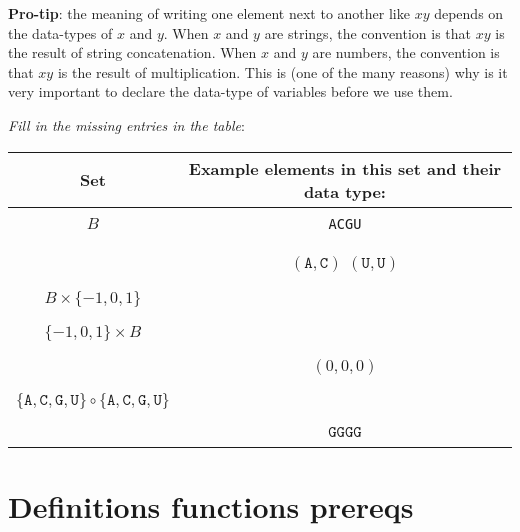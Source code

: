 \documentclass[12pt, oneside]{article}
\newcommand{\A}[0]{\texttt{A}}
\newcommand{\C}[0]{\texttt{C}}
\newcommand{\G}[0]{\texttt{G}}
\newcommand{\U}[0]{\texttt{U}}
\begin{document}
{\bf Pro-tip}: the meaning of writing one element next to another like $xy$ depends on the data-types of $x$ and 
$y$. When $x$ and $y$ are strings, the convention is that $xy$ is the result of string concatenation. 
When $x$ and $y$ are numbers, the convention is that $xy$ is the result of multiplication. This is 
(one of the many reasons) why is it very important to declare the data-type of variables before we use them.

{\it Fill in the missing entries in the table}:

\begin{center}
\begin{tabular}{cc}
{\bf  Set} & {\bf Example elements in this set and their data type}:\\
\hline 
& \\
$B$ &\A \qquad \C \qquad \G \qquad \U \\
& \\
\hline
& \\
\phantom{$B \times B$} & $(\A, \C)$ \qquad $(\U, \U)$\\
& \\
\hline
& \\
$B \times \{-1,0,1\}$ & \\
& \\
\hline
& \\
$\{-1,0,1\} \times B$ & \\
& \\
\hline
& \\
\phantom{$\{-1,0,1\} \times \{-1,0,1\}  \times \{-1,0,1\} $} & \qquad $(0,0,0)$ \\
& \\
\hline
& \\
$ \{\A, \C, \G, \U \} \circ  \{\A, \C, \G, \U \}$& \\
& \\
\hline
& \\
\phantom{$\{G\} \circ \{G\} \circ \{G\}$} & \qquad $\G\G\G\G$ \\
& \\
\hline

\end{tabular}
\end{center}

\vfill \vfill
\section*{Definitions functions prereqs}
\end{document}
